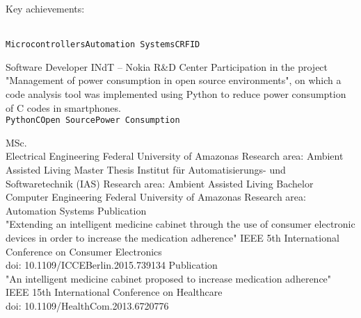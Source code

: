 \documentclass[10pt]{developercv} %
\begin{document}
\begin{entrylist}
  {
    Key achievements:\\
    \begin{contributionlist}
    \end{contributionlist}\\
    \texttt{Microcontrollers}\slashsep\texttt{Automation Systems}\slashsep\texttt{C}\slashsep\texttt{RFID}}
  {Software Developer}
  {INdT -- Nokia R\&D Center}
  {Participation in the project "Management of power consumption in open source environments", on which a code analysis tool was implemented using Python to reduce
power consumption of C codes in smartphones.\\
  \texttt{Python}\slashsep\texttt{C}\slashsep\texttt{Open Source}\slashsep\texttt{Power Consumption}}
\end{entrylist}



\begin{entrylist}
  {MSc.\\Electrical Engineering}
  {Federal University of Amazonas}
  {Research area: Ambient Assisted Living}
  {Master Thesis}
  {Institut für Automatisierungs- und Softwaretechnik (IAS)}
  {Research area: Ambient Assisted Living}
  {Bachelor\\Computer Engineering}
  {Federal University of Amazonas}
  {Research area: Automation Systems}
  {Publication \\"Extending an intelligent medicine cabinet through the use of consumer electronic devices in order to increase the medication adherence"}
  {}
  {IEEE 5th International Conference on Consumer Electronics\\doi: 10.1109/ICCEBerlin.2015.739134}
  {Publication \\"An intelligent medicine cabinet proposed to increase medication adherence"}
  {}
  {IEEE 15th International Conference on Healthcare\\doi: 10.1109/HealthCom.2013.6720776}
\end{entrylist}
\end{document}
